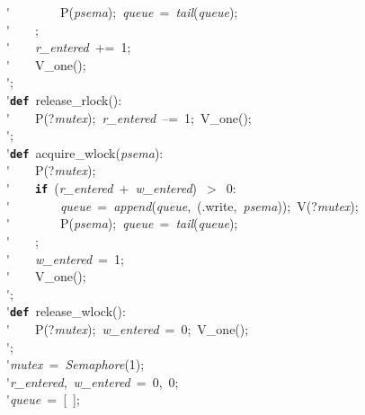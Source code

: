 \'\>~~~~~~~~P(\textit{psema});~\textit{queue}~=~\textit{tail}(\textit{queue});\\

\'\>~~~~;\\

\'\>~~~~\textit{r\_entered}~+=~1;\\

\'\>~~~~V\_one();\\

\'\>;\\

\'\>\texttt{\textbf{def}}~release\_rlock():\\

\'\>~~~~P(?\textit{mutex});~\textit{r\_entered}~--=~1;~V\_one();\\

\'\>;\\

\'\>\texttt{\textbf{def}}~acquire\_wlock(\textit{psema}):\\

\'\>~~~~P(?\textit{mutex});\\

\'\>~~~~\texttt{\textbf{if}}~(\textit{r\_entered}~+~\textit{w\_entered})~$>$~0:\\

\'\>~~~~~~~~\textit{queue}~=~\textit{append}(\textit{queue},~(.write,~\textit{psema}));~V(?\textit{mutex});\\

\'\>~~~~~~~~P(\textit{psema});~\textit{queue}~=~\textit{tail}(\textit{queue});\\

\'\>~~~~;\\

\'\>~~~~\textit{w\_entered}~=~1;\\

\'\>~~~~V\_one();\\

\'\>;\\

\'\>\texttt{\textbf{def}}~release\_wlock():\\

\'\>~~~~P(?\textit{mutex});~\textit{w\_entered}~=~0;~V\_one();\\

\'\>;\\

\'\>\textit{mutex}~=~\textit{Semaphore}(1);\\

\'\>\textit{r\_entered},~\textit{w\_entered}~=~0,~0;\\

\'\>\textit{queue}~=~[~];
